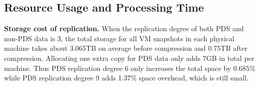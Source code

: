 
\subsection{Resource Usage and Processing Time}


{\bf Storage cost of replication.} 
When the replication degree of both PDS and non-PDS data is 3, 
the total storage  for all VM snapshots in each physical machine takes about 3.065TB on average before compression
and 0.75TB after compression.  Allocating  one extra  copy for PDS data only adds  7GB in total per machine.
Thus PDS replication degree 6 only increases the total space by 0.685\% while PDS replication degree 9 adds 1.37\% 
space overhead, which is still small.

